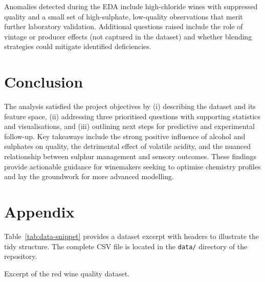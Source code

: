 \documentclass[11pt]{article}
\begin{document}
Anomalies detected during the EDA include high-chloride wines with suppressed
quality and a small set of high-sulphate, low-quality observations that merit
further laboratory validation. Additional questions raised include the role of
vintage or producer effects (not captured in the dataset) and whether blending
strategies could mitigate identified deficiencies.

\section{Conclusion}
The analysis satisfied the project objectives by (i) describing the dataset and
its feature space, (ii) addressing three prioritised questions with supporting
statistics and visualisations, and (iii) outlining next steps for predictive and
experimental follow-up. Key takeaways include the strong positive influence of
alcohol and sulphates on quality, the detrimental effect of volatile acidity,
and the nuanced relationship between sulphur management and sensory outcomes.
These findings provide actionable guidance for winemakers seeking to optimise
chemistry profiles and lay the groundwork for more advanced modelling.

\section*{Appendix}
Table~\ref{tab:data-snippet} provides a dataset excerpt with headers to
illustrate the tidy structure. The complete CSV file is located in the
\texttt{data/} directory of the repository.

\begin{table}[H]
  \centering
  \caption{Excerpt of the red wine quality dataset.}
  \label{tab:data-snippet}
\end{table}
\end{document}
